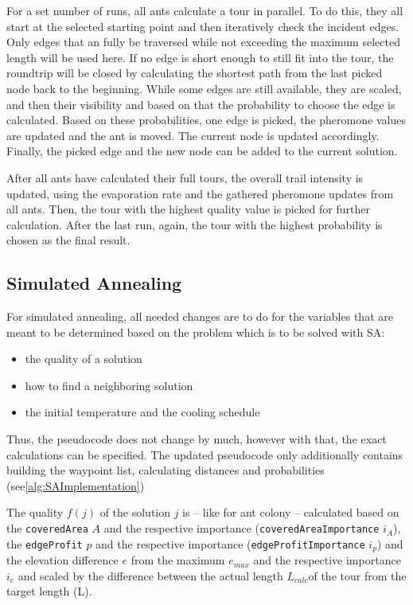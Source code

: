 For a set number of runs, all ants calculate a tour in parallel. 
To do this, they all start at the selected starting point and then iteratively check the incident edges.
Only edges that an fully be traversed while not exceeding the maximum selected length will be used here.
If no edge is short enough to still fit into the tour, the roundtrip will be closed by calculating the shortest path from the last picked node back to the beginning.
While some edges are still available, they are scaled, and then their visibility and based on that the probability to choose the edge is calculated. 
Based on these probabilities, one edge is picked, the pheromone values are updated and the ant is moved.
The current node is updated accordingly. 
Finally, the picked edge and the new node can be added to the current solution.

After all ants have calculated their full tours, the overall trail intensity is updated, using the evaporation rate and the gathered pheromone updates from all ants. 
Then, the tour with the highest quality value is picked for further calculation. 
After the last run, again, the tour with the highest probability is chosen as the final result.



\subsection{Simulated Annealing}
\label{subsec:simulatedAnnealingImplementation}

For simulated annealing, all needed changes are to do for the variables that are meant to be determined based on the problem which is to be solved with SA:
\begin{itemize}
	\item the quality of a solution
	\item how to find a neighboring solution
	\item the initial temperature and the cooling schedule
\end{itemize} 

Thus, the pseudocode does not change by much, however with that, the exact calculations can be specified. 
The updated pseudocode only additionally contains building the waypoint list, calculating distances and probabilities (see\ref{alg:SAImplementation})

The quality $f(j)$ of the solution $j$ is -- like for ant colony -- calculated based on the \texttt{coveredArea} $A$ and the respective importance (\texttt{coveredAreaImportance} $i_A$), the \texttt{edgeProfit} $p$ and the respective importance (\texttt{edgeProfitImportance} $i_p$) and the elevation difference $e$ from the maximum $e_{max}$ and the respective importance $i_e$ and scaled by the difference between the actual length $L_{calc}$of the tour from the target length (L). 

